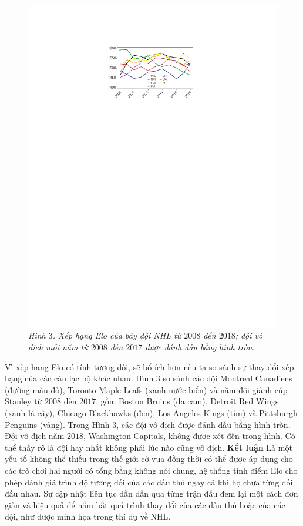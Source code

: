 \begin{multicols}{2}
	\begin{figure}[H]
		\vspace*{-10pt}
		\centering
		\captionsetup{labelformat= empty, justification=centering}
		\includegraphics[width= 0.92\linewidth]{pic4}
		\caption{\small\textit{\color{toanhocdoisong}Hình $3$. Xếp hạng Elo của bảy đội NHL từ $2008$ đến $2018$; đội vô địch mỗi năm từ $2008$ đến $2017$ được đánh dấu bằng hình tròn.}}
		\vspace*{-10pt}
	\end{figure}
	Vì xếp hạng Elo có tính tương đối, sẽ bổ ích hơn nếu ta so sánh sự thay đổi xếp hạng của các câu lạc bộ khác nhau. Hình $3$ so sánh các đội Montreal Canadiens (đường màu đỏ), Toronto Maple Leafs (xanh nước biển) và năm đội giành cúp Stanley từ $2008$ đến $2017$, gồm Boston Bruins (da cam), Detroit Red Wings (xanh lá cây), Chicago Blackhawks (đen), Los Angeles Kings (tím) và Pittsburgh Penguins (vàng).
	\vskip 0.05cm
	Trong Hình $3$, các đội vô địch được đánh dấu bằng hình tròn. Đội vô địch năm $2018$, Washington Capitals, không được xét đến trong hình. Có thể thấy rõ là đội hay nhất không phải lúc nào cũng vô địch.
	\vskip 0.05cm
	\textbf{\color{toanhocdoisong}Kết luận}
	\vskip 0.05cm
	Là một yếu tố không thể thiếu trong thế giới cờ vua đồng thời có thể được áp dụng cho các trò chơi hai người có tổng bằng không nói chung, hệ thống tính điểm Elo cho phép đánh giá trình độ tương đối của các đấu thủ ngay cả khi họ chưa từng đối đầu nhau. Sự cập nhật liên tục dần dần qua từng trận đấu đem lại một cách đơn giản và hiệu quả để nắm bắt quá trình thay đổi của các đấu thủ hoặc của các đội, như được minh họa trong thí dụ về NHL.
\end{multicols}
